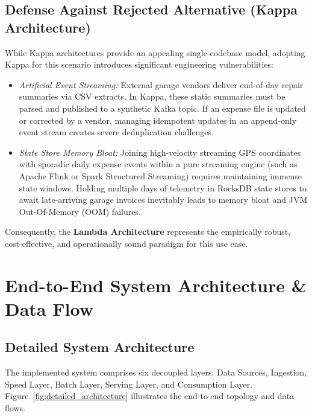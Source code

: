 \documentclass[11pt,a4paper]{article}
\begin{document}
\subsection{Defense Against Rejected Alternative (Kappa Architecture)}
While Kappa architectures provide an appealing single-codebase model, adopting Kappa for this scenario introduces significant engineering vulnerabilities:
\begin{itemize}
    \item \textit{Artificial Event Streaming:} External garage vendors deliver end-of-day repair summaries via CSV extracts. In Kappa, these static summaries must be parsed and published to a synthetic Kafka topic. If an expense file is updated or corrected by a vendor, managing idempotent updates in an append-only event stream creates severe deduplication challenges.
    \item \textit{State Store Memory Bloat:} Joining high-velocity streaming GPS coordinates with sporadic daily expense events within a pure streaming engine (such as Apache Flink or Spark Structured Streaming) requires maintaining immense state windows. Holding multiple days of telemetry in RocksDB state stores to await late-arriving garage invoices inevitably leads to memory bloat and JVM Out-Of-Memory (OOM) failures.
\end{itemize}
Consequently, the \textbf{Lambda Architecture} represents the empirically robust, cost-effective, and operationally sound paradigm for this use case.

\section{End-to-End System Architecture \& Data Flow}
\subsection{Detailed System Architecture}
The implemented system comprises six decoupled layers: Data Sources, Ingestion, Speed Layer, Batch Layer, Serving Layer, and Consumption Layer. Figure~\ref{fig:detailed_architecture} illustrates the end-to-end topology and data flows.
\end{document}
